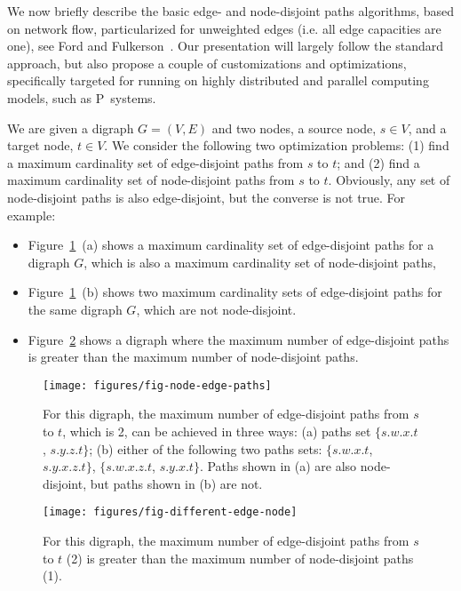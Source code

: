 \documentclass[preliminary,copyright,creativecommons]{eptcs}
\theoremstyle{remark}
\begin{document}
We now briefly describe the basic edge- and node-disjoint paths algorithms, 
based on network flow, particularized for unweighted edges 
(i.e. all edge capacities are one), see Ford and Fulkerson~\cite{FordF1956}.
Our presentation will largely follow the standard approach, but also 
propose a couple of customizations and optimizations, specifically targeted for  
running on highly distributed and parallel computing models,
such as P~systems.

We are given a digraph $G=(V,E)$ and two nodes, 
a source node, $s \in V$, and a target node, $t \in V$.
We consider the following two optimization problems:
(1) find a maximum cardinality set of edge-disjoint paths from $s$ to $t$; and
(2) find a maximum cardinality set of node-disjoint paths from $s$ to $t$.
Obviously, any set of node-disjoint paths is also edge-disjoint,
but the converse is not true.
For example: 
\begin{itemize}
\item Figure~\ref{fig-node-edge-paths}~(a) 
shows a maximum cardinality set of edge-disjoint paths for a digraph $G$,
which is also a maximum cardinality set of node-disjoint paths,
\item Figure~\ref{fig-node-edge-paths}~(b) 
shows two maximum cardinality sets of edge-disjoint paths for the same digraph $G$,
which are not node-disjoint.
\item Figure~\ref{fig-different-edge-node} shows a digraph where 
the maximum number of edge-disjoint paths
is greater than the maximum number of node-disjoint paths.
\end{itemize}

\begin{figure}[h]
\centerline{\texttt{[image: figures/fig-node-edge-paths]}}
\caption{For this digraph, the maximum number of edge-disjoint paths from $s$ to $t$, 
which is 2, can be achieved in three ways: 
(a) paths set $\{ s.w.x.t$, $s.y.z.t\}$;
(b) either of the following two paths sets: 
$\{ s.w.x.t$, $s.y.x.z.t\}$, $\{ s.w.x.z.t$, $s.y.x.t\}$.
Paths shown in (a) are also node-disjoint, but paths shown in (b) are not.}
\label{fig-node-edge-paths}
\end{figure}

\begin{figure}[h]
\centerline{\texttt{[image: figures/fig-different-edge-node]}}
\caption{For this digraph, 
the maximum number of edge-disjoint paths from $s$ to $t$ (2) 
is greater than the maximum number of node-disjoint paths (1).}
\label{fig-different-edge-node}
\end{figure}
\end{document}
